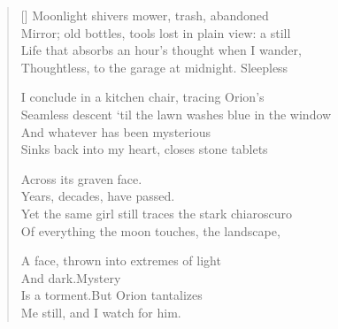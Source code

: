 \label{ch:listening_to_neil_young}
\settowidth{\versewidth}{Seamless descent 'til the lawn washes blue in the window}
\begin{verse}[\versewidth]
Moonlight shivers mower, trash, abandoned\\
Mirror; old bottles, tools lost in plain view: a still\\
Life that absorbs an hour's thought when I wander,\\
Thoughtless, to the garage at midnight.   Sleepless

I conclude in a kitchen chair, tracing Orion's\\
Seamless descent `til the lawn washes blue in the window\\
And whatever has been mysterious\\
Sinks back into my heart, closes stone tablets

Across its graven face.\\
\hspace*{3\vgap} Years, decades, have passed.\\
Yet the same girl still traces the stark chiaroscuro\\
Of everything the moon touches, the landscape,

A face, thrown into extremes of light\\
And dark.\qquad Mystery\\
Is a torment.\qquad But Orion tantalizes\\
Me still, and I watch for him.
\end{verse}
